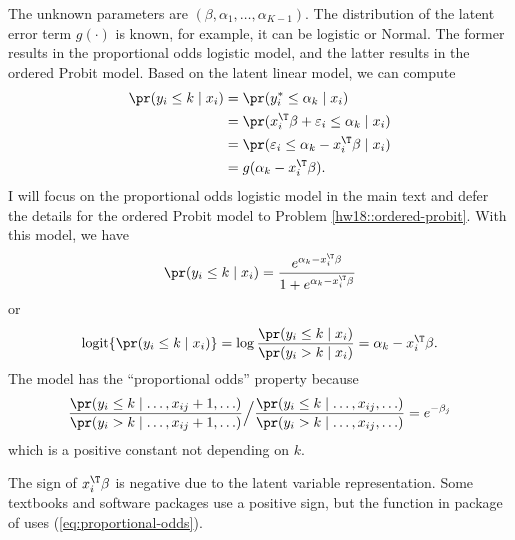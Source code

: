 The unknown parameters are $(\beta,\alpha_{1},\ldots,\alpha_{K-1})$.
The distribution of the latent error term $g(\cdot)$ is known, for
example, it can be logistic or Normal. The former results in the proportional
odds logistic model, and the latter results in the ordered Probit
model. Based on the latent linear model, we can compute 
\begin{align*}
\pr(y_{i}  \leq k\mid x_{i}) &=\pr(y_{i}^{*}\leq\alpha_{k}\mid x_{i})\\
 & =\pr(x_{i}^{\T}\beta+\varepsilon_{i}\leq\alpha_{k}\mid x_{i})\\
 & =\pr(\varepsilon_{i}\leq\alpha_{k}-x_{i}^{\T}\beta\mid x_{i})\\
 & =g(\alpha_{k}-x_{i}^{\T}\beta).
\end{align*}
I will focus on the proportional odds logistic model in the main text and defer the details for the ordered Probit model to Problem \ref{hw18::ordered-probit}.
With this model, we have
\[
\pr(y_{i}\leq k\mid x_{i})=\frac{e^{\alpha_{k}-x_{i}^{\T}\beta}}{1+e^{\alpha_{k}-x_{i}^{\T}\beta}}
\]
or
\begin{equation}
\text{logit}\{  \pr(y_{i}\leq k\mid x_{i})  \} =\log\frac{\pr(y_{i}\leq k\mid x_{i})}{\pr(y_{i}>k\mid x_{i})}=\alpha_{k}-x_{i}^{\T}\beta . \label{eq:proportional-odds}
\end{equation}
The model has the ``proportional odds'' property because
$$
\frac{\pr(y_{i}\leq k\mid \ldots, x_{ij}+1,\ldots )}{\pr(y_{i}>k\mid \ldots, x_{ij}+1,\ldots)} 
\Big/ \frac{\pr(y_{i}\leq k\mid \ldots, x_{ij},\ldots)}{\pr(y_{i}>k\mid \ldots, x_{ij},\ldots)}
= e^{-\beta_j}
$$
which is a positive constant not depending on $k$. 


The sign of $x_{i}^{\T}\beta$ is negative due to the latent variable
representation. Some textbooks and software packages use a positive
sign, but the function  in package  of  uses (\ref{eq:proportional-odds}).


